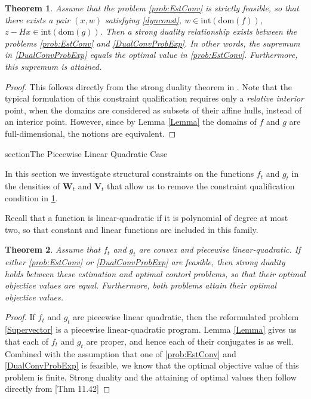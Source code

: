 \documentclass[12pt]{article}
\renewcommand{\vec}[1]{\mathbf{#1}}
\newtheorem{theorem}{Theorem}[section]
\theoremstyle{remark}
\theoremstyle{remark}
\begin{document}
\begin{theorem}\cite[Theorem 28.2]{ConvAnal} \label{StrongDual}
 Assume that the problem \ref{prob:EstConv} is strictly
feasible, so that there exists a pair $(x,w)$ satisfying
\eqref{dynconst}, $w \in \text{int}(\text{dom}(f))$, $z-Hx \in
\text{int}(\text{dom}(g))$. Then a strong duality relationship exists between the problems
\ref{prob:EstConv} and \ref{DualConvProbExp}. In other words, the supremum in
\ref{DualConvProbExp} equals the optimal
value in \ref{prob:EstConv}. Furthermore, this supremum is attained. 
\end{theorem}
\begin{proof}
This follows directly from the strong duality theorem 
in \cite[Theorem 28.2]{ConvAnal}. Note that the typical formulation of
this constraint qualification requires only a \emph{relative interior}
point, when the domains are considered as subsets of their affine
hulls, instead of an interior point. However, since by Lemma
\ref{Lemma} the domains of $f$ and $g$ are full-dimensional, the
notions are equivalent.
\end{proof}

section{The Piecewise Linear Quadratic Case}

In this section we investigate structural constraints on the functions
$f_{t}$ and $g_{t}$ in the densities of $\vec{W}_{t}$ and $\vec{V}_{t}$ 
that allow us to remove the constraint qualification condition in
\ref{StrongDual}. 

Recall that a function is linear-quadratic if it is polynomial of
degree at most two, so that constant and linear functions are included
in this family. 
\begin{theorem}\label{theorem:PLQ}
 Assume that $f_{t}$ and $g_{t}$ are convex and piecewise 
linear-quadratic. If either \ref{prob:EstConv} or \ref{DualConvProbExp} are
feasible, then strong duality holds between these estimation and
optimal contorl problems, so that
their optimal objective values are equal. Furthermore, both problems
attain their optimal objective values. 
\end{theorem}
\begin{proof} 
If $f_{t}$ and $g_{t}$ are piecewise linear quadratic, then the reformulated
problem \ref{Supervector} is a piecewise linear-quadratic program.
Lemma \ref{Lemma} gives us that each of $f_{t}$ and $g_{t}$ are
proper, and hence each of their conjugates is as well. Combined with the
assumption that one of \ref{prob:EstConv} and \ref{DualConvProbExp} is
feasible, we know that the optimal objective value of this problem is finite. 
Strong duality and the attaining of optimal values then follow directly 
from \cite{VarAnal}[Thm 11.42]
\end{proof}
\end{document}
